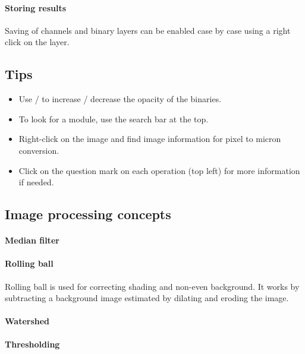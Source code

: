 \paragraph{Storing results}

Saving of channels and binary layers can be enabled case by case using a right click on the layer. 

\subsection{Tips}
\begin{itemize}
    \item Use \keys{\Alt+\arrowkeyup} / \keys{\Alt+\arrowkeydown}  to increase / decrease the opacity of the binaries.
    \item To look for a module, use the search bar at the top.
    \item Right-click on the image and find image information for pixel to micron conversion.
    \item Click on the question mark on each operation (top left) for more information if needed.
\end{itemize}

\subsection{Image processing concepts}

\paragraph{Median filter} 

\paragraph{Rolling ball} Rolling ball is used for correcting shading and non-even background. It works by subtracting a background image estimated by dilating and eroding the image.

\paragraph{Watershed}

\paragraph{Thresholding}




